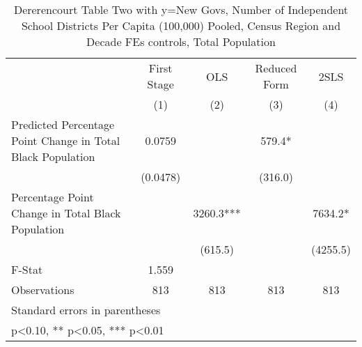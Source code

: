 \begin{table}[htbp]\centering
\def\sym#1{\ifmmode^{#1}\else\(^{#1}\)\fi}
\caption{Dererencourt Table Two with y=New Govs, Number of Independent School Districts Per Capita (100,000) Pooled, Census Region and Decade FEs controls, Total Population}
\begin{tabular}{l*{4}{c}}
\toprule
                    & First Stage   &         OLS   &Reduced Form   &        2SLS   \\
                    &\multicolumn{1}{c}{(1)}   &\multicolumn{1}{c}{(2)}   &\multicolumn{1}{c}{(3)}   &\multicolumn{1}{c}{(4)}   \\
\midrule
Predicted Percentage Point Change in Total Black Population&      0.0759   &               &       579.4*  &               \\
                    &    (0.0478)   &               &     (316.0)   &               \\
\addlinespace
Percentage Point Change in Total Black Population&               &      3260.3***&               &      7634.2*  \\
                    &               &     (615.5)   &               &    (4255.5)   \\
\midrule
F-Stat              &       1.559   &               &               &               \\
Observations        &         813   &         813   &         813   &         813   \\
\bottomrule
\multicolumn{5}{l}{\footnotesize Standard errors in parentheses}\\
\multicolumn{5}{l}{\footnotesize * p<0.10, ** p<0.05, *** p<0.01}\\
\end{tabular}
\end{table}
